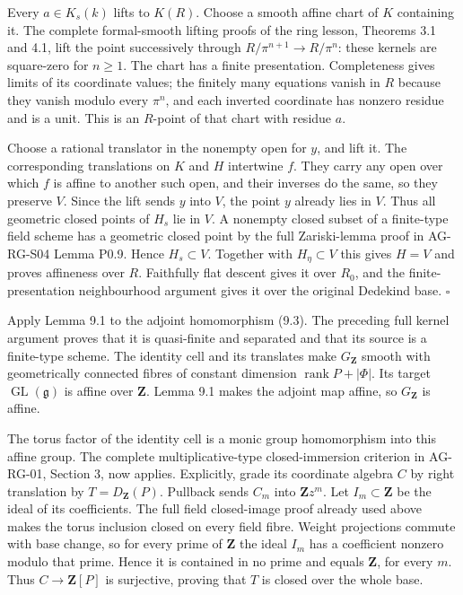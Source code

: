 \documentclass[11pt,a4paper,openany]{report}
\newcounter{none}
\begin{document}
Every \(a\in K_s(k)\) lifts to \(K(R)\). Choose a smooth affine chart of \(K\) containing it. The complete formal-smooth lifting proofs of the ring lesson, Theorems 3.1 and 4.1, lift the point successively through \(R/\pi^{n+1}\to R/\pi^n\): these kernels are square-zero for \(n\geq1\). The chart has a finite presentation. Completeness gives limits of its coordinate values; the finitely many equations vanish in \(R\) because they vanish modulo every \(\pi^n\), and each inverted coordinate has nonzero residue and is a unit. This is an \(R\)-point of that chart with residue \(a\).

Choose a rational translator in the nonempty open for \(y\), and lift it. The corresponding translations on \(K\) and \(H\) intertwine \(f\). They carry any open over which \(f\) is affine to another such open, and their inverses do the same, so they preserve \(V\). Since the lift sends \(y\) into \(V\), the point \(y\) already lies in \(V\). Thus all geometric closed points of \(H_s\) lie in \(V\). A nonempty closed subset of a finite-type field scheme has a geometric closed point by the full Zariski-lemma proof in AG-RG-S04 Lemma P0.9. Hence \(H_s\subset V\). Together with \(H_\eta\subset V\) this gives \(H=V\) and proves affineness over \(R\). Faithfully flat descent gives it over \(R_0\), and the finite-presentation neighbourhood argument gives it over the original Dedekind base. \(\square\)

Apply Lemma 9.1 to the adjoint homomorphism (9.3). The preceding full kernel argument proves that it is quasi-finite and separated and that its source is a finite-type scheme. The identity cell and its translates make \(G_{\mathbf Z}\) smooth with geometrically connected fibres of constant dimension \(\operatorname{rank}P+|\Phi|\). Its target \(\operatorname{GL}(\mathfrak g)\) is affine over \(\mathbf Z\). Lemma 9.1 makes the adjoint map affine, so \(G_{\mathbf Z}\) is affine.

The torus factor of the identity cell is a monic group homomorphism into this affine group. The complete multiplicative-type closed-immersion criterion in AG-RG-01, Section 3, now applies. Explicitly, grade its coordinate algebra \(C\) by right translation by \(T=D_{\mathbf Z}(P)\). Pullback sends \(C_m\) into \(\mathbf Z z^m\). Let \(I_m\subset\mathbf Z\) be the ideal of its coefficients. The full field closed-image proof already used above makes the torus inclusion closed on every field fibre. Weight projections commute with base change, so for every prime of \(\mathbf Z\) the ideal \(I_m\) has a coefficient nonzero modulo that prime. Hence it is contained in no prime and equals \(\mathbf Z\), for every \(m\). Thus \(C\to\mathbf Z[P]\) is surjective, proving that \(T\) is closed over the whole base.
\end{document}
